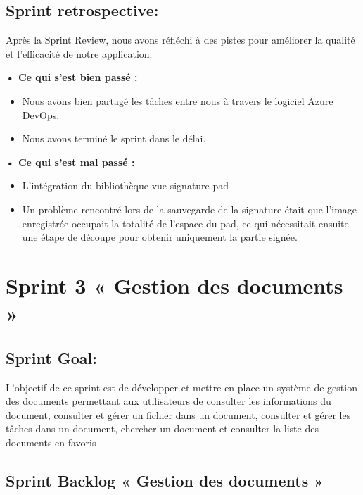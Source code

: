 \subsection{Sprint retrospective:}

Après la Sprint Review, nous avons réfléchi à des pistes pour améliorer la qualité et l'efficacité de notre application.

\noindent\textbf{•	Ce qui s'est bien passé :}
\begin{itemize}
  \item Nous avons bien partagé les tâches entre nous à travers le logiciel Azure DevOps. 
  \item Nous avons terminé le sprint dans le délai.
\end{itemize}

\noindent\textbf{•	Ce qui s'est mal passé :}
\begin{itemize}
  \item L'intégration du bibliothèque vue-signature-pad
  \item Un problème rencontré lors de la sauvegarde de la signature était que l'image enregistrée occupait la totalité de l'espace du pad, ce qui nécessitait ensuite une étape de découpe pour obtenir uniquement la partie signée.
\end{itemize}

\section{Sprint 3 « Gestion des documents »}
\subsection{Sprint Goal:}

L'objectif de ce sprint est de développer et mettre en place un système de gestion des documents permettant aux utilisateurs de consulter les informations du document, consulter et gérer un fichier dans un document, consulter et gérer les tâches dans un document, chercher un document et consulter la liste des documents en favoris

\pagebreak

\subsection{Sprint Backlog « Gestion des documents »}

